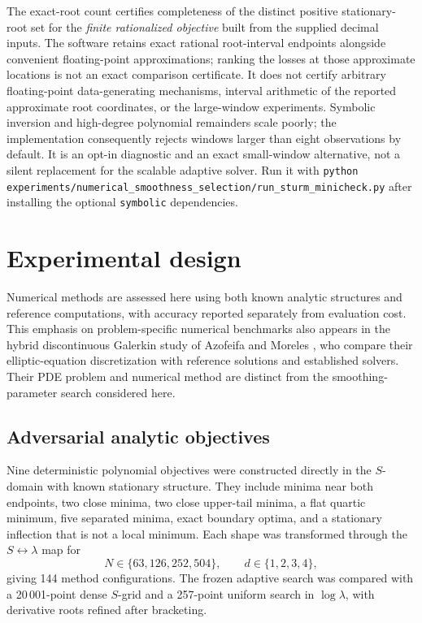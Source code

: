 \documentclass[english]{smcca}
\begin{document}
The exact-root count certifies completeness of the distinct
positive stationary-root set for the \emph{finite rationalized
objective} built from the supplied decimal inputs. The software
retains exact rational root-interval endpoints alongside convenient
floating-point approximations; ranking the losses at those
approximate locations is not an exact comparison certificate. It does not certify arbitrary floating-point
data-generating mechanisms, interval arithmetic of the
reported approximate root coordinates, or the large-window
experiments. Symbolic inversion and high-degree polynomial
remainders scale poorly; the implementation consequently
rejects windows larger than eight observations by default.
It is an opt-in diagnostic and an exact small-window
alternative, not a silent replacement for the scalable
adaptive solver. Run it with
\texttt{python experiments/numerical\_smoothness\_selection/run\_sturm\_minicheck.py}
after installing the optional \texttt{symbolic} dependencies.

\section{Experimental design}

Numerical methods are assessed here using both known analytic structures and reference computations, with accuracy reported separately from evaluation cost. This emphasis on problem-specific numerical benchmarks also appears in the hybrid discontinuous Galerkin study of Azofeifa and Moreles \cite{azofeifa2025hybrid}, who compare their elliptic-equation discretization with reference solutions and established solvers. Their PDE problem and numerical method are distinct from the smoothing-parameter search considered here.

\subsection{Adversarial analytic objectives}

Nine deterministic polynomial objectives were constructed directly in the \(S\)-domain with known stationary structure. They include minima near both endpoints, two close minima, two close upper-tail minima, a flat quartic minimum, five separated minima, exact boundary optima, and a stationary inflection that is not a local minimum. Each shape was transformed through the \(S\leftrightarrow\lambda\) map for
\[
N\in\{63,126,252,504\},
\qquad
d\in\{1,2,3,4\},
\]
giving 144 method configurations. The frozen adaptive search was compared with a 20\,001-point dense \(S\)-grid and a 257-point uniform search in \(\log\lambda\), with derivative roots refined after bracketing.
\end{document}
